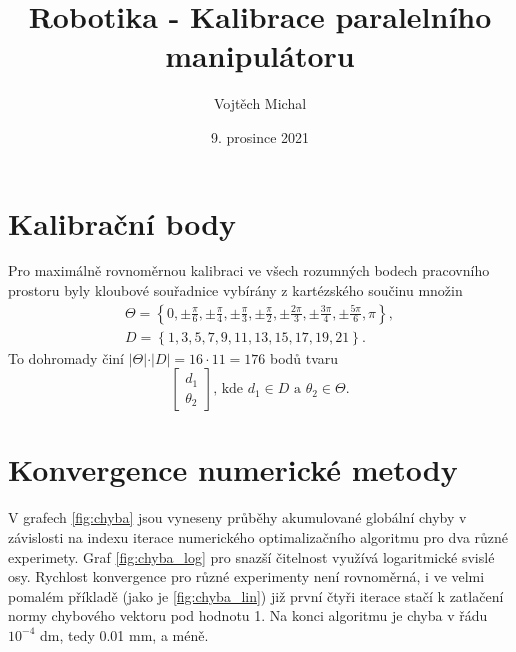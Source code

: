 \documentclass[twoside]{article}
\title{Robotika - Kalibrace paralelního manipulátoru}
\author{Vojtěch Michal}
\date{9. prosince 2021}
\begin{document}
\maketitle

\section{Kalibrační body}
Pro maximálně rovnoměrnou kalibraci ve všech rozumných bodech pracovního prostoru byly kloubové souřadnice vybírány z kartézského součinu
množin
\begin{equation}
	\begin{split}
		\Theta = \left\{0, \pm \frac{\pi}{6}, \pm \frac{\pi}{4}, \pm \frac{\pi}{3}, \pm \frac{\pi}{2}, \pm \frac{2\pi}{3}, \pm \frac{3\pi}{4},\pm \frac{5\pi}{6}, \pi \right\},  \\
		D = \left\{1,3,5,7,9,11,13,15,17,19,21\right\}.
	\end{split}
\end{equation}
To dohromady činí $\vert\Theta\vert \cdot \vert D \vert = 16 \cdot 11 = 176$ bodů tvaru
\begin{equation}
	\begin{bmatrix}
		d_1 \\ \theta_2
	\end{bmatrix} \text{, kde } d_1 \in D \text{ a } \theta_2 \in \Theta.
\end{equation}

\section{Konvergence numerické metody}

V grafech \ref{fig:chyba} jsou vyneseny průběhy akumulované globální chyby v závislosti na indexu iterace numerického optimalizačního algoritmu
pro dva různé experimety. Graf \ref{fig:chyba_log} pro snazší čitelnost využívá logaritmické svislé osy.
Rychlost konvergence pro různé experimenty není rovnoměrná, i ve velmi pomalém příkladě (jako je \ref{fig:chyba_lin}) již první čtyři 
iterace stačí k zatlačení normy chybového vektoru pod hodnotu 1.
Na konci algoritmu je chyba v řádu $10^{-4}$ dm, tedy 0.01 mm, a méně.
\end{document}
